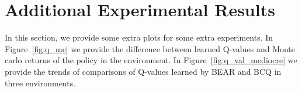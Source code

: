\section{Additional Experimental Results}
\label{exp:additional_results}

In this section, we provide some extra plots for some extra experiments. In Figure~\ref{fig:q_mc} we provide the difference between learned Q-values and Monte carlo returns of the policy in the environment. In Figure~\ref{fig:q_val_mediocre} we provide the trends of comparisons of Q-values learned by BEAR and BCQ in three environments. 

\label{app:q_vs_mc}
